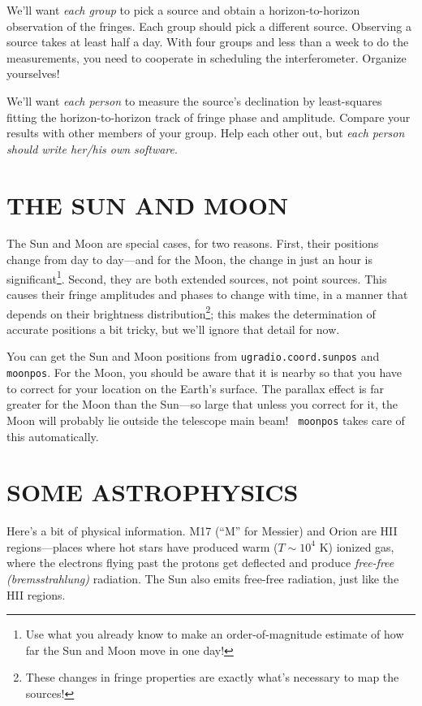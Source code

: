 \documentclass[11pt,preprint]{aastex}
\begin{document}
We'll want {\it each group} to pick a source and obtain a
horizon-to-horizon observation of the fringes. Each group should pick a
different source. Observing a source takes at least half a day. With
four groups and less than a week to do the measurements, you need to
cooperate in scheduling the interferometer. Organize yourselves!

We'll want {\it each person} to measure the source's
declination by least-squares fitting the horizon-to-horizon track of
fringe phase and amplitude.  Compare your results with other members of
your group.  Help each other out, but {\it each person should write
  her/his own software}.

\section{THE SUN AND MOON}

	The Sun and Moon are special cases, for two reasons. First, 
their positions change from day to day---and for the Moon, the change in
just an hour is significant\footnote{Use what you already know to make
an order-of-magnitude estimate of how far the Sun and Moon move in one
day!}.  Second, they are both extended sources, not point sources. This
causes their fringe amplitudes and phases to change with time, in a
manner that depends on their brightness distribution\footnote{These
changes in fringe properties are exactly what's necessary to map the
sources!}; this makes the determination of accurate positions a bit
tricky, but we'll ignore that detail for now.

	You can get the Sun and Moon positions from 
        {\tt ugradio.coord.sunpos} and {\tt moonpos}.  For the Moon, you should be aware
        that it is nearby so that you have to correct for your location
        on the Earth's surface. The parallax effect is far greater for
        the Moon than the Sun---so large that unless you correct for it,
        the Moon will probably lie outside the telescope main beam! {\tt
          moonpos} takes care of this automatically.

\section{SOME ASTROPHYSICS}

Here's a bit of physical information.  M17 (``M'' for Messier) and Orion
are HII regions---places where hot stars have produced warm ($T \sim
10^4$ K) ionized gas, where the electrons flying past the protons get
deflected and produce {\it free-free (bremsstrahlung)} radiation.  The
Sun also emits free-free radiation, just like the HII regions.
\end{document}
